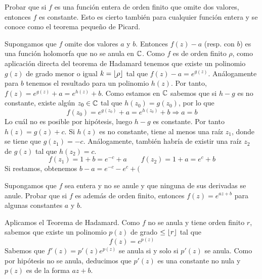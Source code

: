 \documentclass[twoside]{article}
\begin{document}
\newpage

\begin{ejercicio}{4}
Probar que si $f$ es una función entera de orden finito que omite dos valores, entonces $f$ es constante. Esto es cierto también para cualquier función entera y se conoce como el teorema pequeño de Picard.
\end{ejercicio}
\begin{solucion}
Supongamos que $f$ omite dos valores $a$ y $b$. Entonces $f(z)-a$ (resp. con $b$) es una función holomorfa que no se anula en $\mathbb{C}$. Como $f$ es de orden finito $\rho$, como aplicación directa del teorema de Hadamard tenemos que existe un polinomio $g(z)$ de grado menor o igual $k=\left\lfloor{\rho}\right\rfloor$ tal que $f(z)-a=e^{g(z)}$. Análogamente para $b$ tenemos el resultado para un polinomio $h(z)$. Por tanto, $f(z)=e^{g(z)}+a=e^{h(z)}+b$. Como estamos en $\mathbb{C}$ sabemos que si $h-g$ es no constante, existe algún $z_0\in \mathbb{C}$ tal que $h(z_0)=g(z_0)$, por lo que 
$$
f(z_0) = e^{g(z_0)}+a=e^{h(z_0)}+b \Rightarrow a = b
$$
Lo cuál no es posible por hipótesis, luego $h-g$ es constante. Por tanto $h(z)=g(z)+c$. Si $h(z)$ es no constante, tiene al menos una raíz $z_1$, donde se tiene que $g(z_1)=-c$. Análogamente, también habría de existir una raíz $z_2$ de $g(z)$ tal que $h(z_2)=c$.
$$
f(z_1)=1+b = e^{-c}+a \qquad f(z_2) = 1 + a = e^{c}+b
$$
Si restamos, obtenemos $b-a = e^{-c}-e^c + ($


\end{solucion}

\newpage


\begin{ejercicio}{5}
Supongamos que $f$ sea entera y no se anule y que ninguna de sus derivadas se anule. Probar que si $f$ es además de orden finito, entonces $f(z)=e^{az+b}$ para algunas constantes $a$ y $b$.
\end{ejercicio}
\begin{solucion}
Aplicamos el Teorema de Hadamard. Como $f$ no se anula y tiene orden finito $r$, sabemos que existe un polinomio $p(z)$ de grado $\leq \left\lfloor{r}\right\rfloor$ tal que
$$
f(z)=e^{p(z)}
$$
Sabemos que $f'(z)=p'(z)e^{p(z)}$ se anula si y solo si $p'(z)$ se anula. Como por hipótesis no se anula, deducimos que $p'(z)$ es una constante no nula y $p(z)$ es de la forma $az+b$.
\end{solucion}
\newpage
\end{document}

